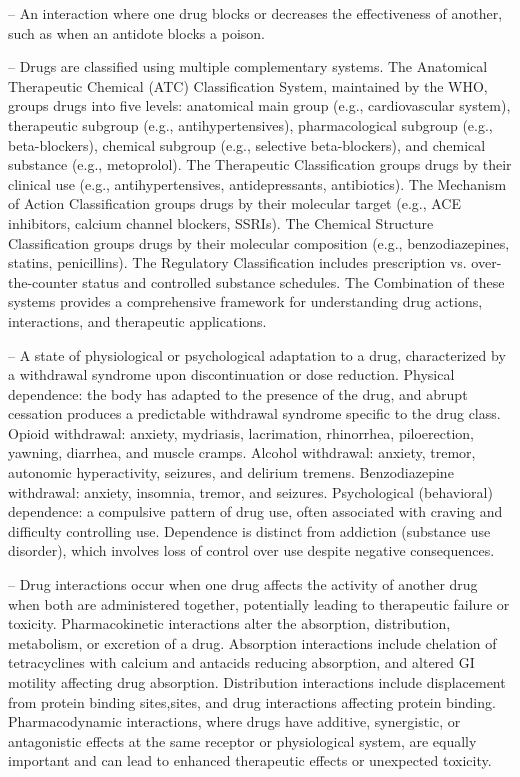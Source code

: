 -- An interaction where one drug blocks or decreases the effectiveness of another, such as when an antidote blocks a poison.

-- Drugs are classified using multiple complementary systems. The Anatomical Therapeutic Chemical (ATC) Classification System, maintained by the WHO, groups drugs into five levels: anatomical main group (e.g., cardiovascular system), therapeutic subgroup (e.g., antihypertensives), pharmacological subgroup (e.g., beta-blockers), chemical subgroup (e.g., selective beta-blockers), and chemical substance (e.g., metoprolol). The Therapeutic Classification groups drugs by their clinical use (e.g., antihypertensives, antidepressants, antibiotics). The Mechanism of Action Classification groups drugs by their molecular target (e.g., ACE inhibitors, calcium channel blockers, SSRIs). The Chemical Structure Classification groups drugs by their molecular composition (e.g., benzodiazepines, statins, penicillins). The Regulatory Classification includes prescription vs. over-the-counter status and controlled substance schedules. The Combination of these systems provides a comprehensive framework for understanding drug actions, interactions, and therapeutic applications.

-- A state of physiological or psychological adaptation to a drug, characterized by a withdrawal syndrome upon discontinuation or dose reduction. Physical dependence: the body has adapted to the presence of the drug, and abrupt cessation produces a predictable withdrawal syndrome specific to the drug class. Opioid withdrawal: anxiety, mydriasis, lacrimation, rhinorrhea, piloerection, yawning, diarrhea, and muscle cramps. Alcohol withdrawal: anxiety, tremor, autonomic hyperactivity, seizures, and delirium tremens. Benzodiazepine withdrawal: anxiety, insomnia, tremor, and seizures. Psychological (behavioral) dependence: a compulsive pattern of drug use, often associated with craving and difficulty controlling use. Dependence is distinct from addiction (substance use disorder), which involves loss of control over use despite negative consequences.

-- Drug interactions occur when one drug affects the activity of another drug when both are administered together, potentially leading to therapeutic failure or toxicity. Pharmacokinetic interactions alter the absorption, distribution, metabolism, or excretion of a drug. Absorption interactions include chelation of tetracyclines with calcium and antacids reducing absorption, and altered GI motility affecting drug absorption. Distribution interactions include displacement from protein binding sites,sites, and drug interactions affecting protein binding. Pharmacodynamic interactions, where drugs have additive, synergistic, or antagonistic effects at the same receptor or physiological system, are equally important and can lead to enhanced therapeutic effects or unexpected toxicity.

